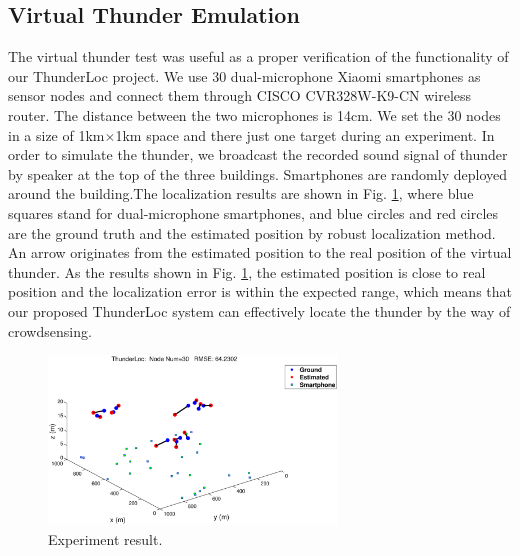 \subsection{Virtual Thunder Emulation}

The virtual thunder test was useful as a proper verification of the functionality of our ThunderLoc project. 
We use 30 dual-microphone Xiaomi smartphones as sensor nodes and connect them through CISCO CVR328W-K9-CN wireless router. 
The distance between the two microphones is 14cm. We set the 30 nodes in a size of 1km$\times$1km space and there just one target during an experiment.
In order to simulate the thunder, we broadcast the recorded sound signal of thunder by speaker at the top of the three buildings. 
Smartphones are randomly deployed around the building.The localization results are shown in Fig. \ref{Virtual}, where blue squares stand for dual-microphone smartphones, and blue circles and red circles are the ground truth and the estimated position by robust localization method. 
An arrow originates from the estimated position to the real position of the virtual thunder. 
As the results shown in Fig. \ref{Virtual}, the estimated position is close to real position and the localization error is within the expected range,
which means that our proposed ThunderLoc system can effectively locate the thunder  by the way of crowdsensing.
  \begin{figure}[ht]
            \setlength{\abovecaptionskip}{0pt}
            \centering
            \includegraphics[scale=2,height=4.5cm]{image/virtual.eps}
     \vspace{2mm}
            \caption{Experiment result.}
            \label{Virtual}
            \vspace{-8mm}
  \end{figure}


